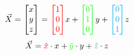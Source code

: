 \documentclass[preview]{standalone}
\begin{document}
$$\vec{X} = \begin{bmatrix}x\\y\\z\end{bmatrix} = \textcolor{red}{\begin{bmatrix}1\\0\\0\end{bmatrix}} x + \textcolor{green}{\begin{bmatrix}0\\1\\0\end{bmatrix}} y + \textcolor{cyan}{\begin{bmatrix}0\\0\\1\end{bmatrix}} z$$
$$\vec{X} = \textcolor{red}{\hat{x}}\cdot x + \textcolor{green}{\hat{y}}\cdot y + \textcolor{cyan}{\hat{z}}\cdot z$$
\end{document}
